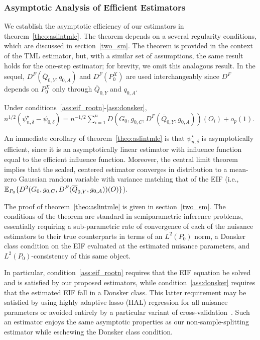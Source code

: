 \subsubsection{Asymptotic Analysis of Efficient Estimators}\label{asymp_analy}

We establish the asymptotic efficiency of our estimators in
theorem~\ref{theo:aslintmle}. The theorem depends on a several regularity
conditions, which are discussed in section~\ref{two_sm}. The
theorem is provided in the context of the TML estimator, but, with a similar set
of assumptions, the same result holds for the one-step estimator; for brevity,
we omit this analogous result. In the sequel, $D^F(\overline{Q}_{0,Y}, q_{0,A})$
and $D^F(P_0^X)$ are used interchangeably since $D^F$ depends on $P_0^X$ only
through $\overline{Q}_{0,Y}$ and $q_{0,A}$.

\begin{theorem}\label{theo:aslintmle} Under
  conditions~\ref{ass:eif_rootn}-\ref{ass:donsker},
  $n^{1/2}\left(\psi_{n,\delta}^{\star} - \psi_{0,\delta}\right) =
      n^{-1/2} \sum^{n}_{i = 1} D(G_0, g_{0,C},
      D^F(\overline{Q}_{0,Y},g_{0,A}))(O_i) + o_p(1) $.
\end{theorem}

An immediate corollary of theorem~\ref{theo:aslintmle} is that
$\psi_{n,\delta}^{\star}$ is asymptotically efficient, since it is an
asymptotically linear estimator with influence function equal to the efficient
influence function. Moreover, the central limit theorem implies that the scaled,
centered estimator converges in distribution to a mean-zero Gaussian random
variable with variance matching that of the EIF (i.e., $\mathbb{E}_{P_0} \{D^2(G_0,
g_{0,C}, D^F(\overline{Q}_{0,Y},g_{0,A}))(O)\}$).

The proof of theorem~\ref{theo:aslintmle} is given in
section~\ref{two_sm}. The conditions of the theorem are standard
in semiparametric inference problems, essentially requiring a sub-parametric
rate of convergence of each of the nuisance estimators to their true
counterparts in terms of an $L^2(P_0)$ norm, a Donsker class condition on the
EIF evaluated at the estimated nuisance parameters, and $L^2(P_0)$-consistency
of this same object.

In particular, condition~\ref{ass:eif_rootn} requires that the EIF equation
be solved and is satisfied by our proposed estimators, while
condition~\ref{ass:donsker} requires that the estimated EIF fall in
a Donsker class. This latter requirement may be satisfied by using highly
adaptive lasso (HAL) regression for all nuisance parameters or avoided entirely
by a particular variant of cross-validation~\citep{klaassen1987consistent,
zheng2011cross, chernozhukov2018double}. Such an estimator enjoys the same
asymptotic properties as our non-sample-splitting estimator while eschewing the
Donsker class condition.

